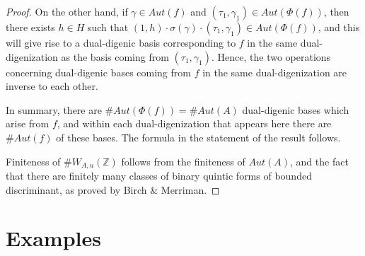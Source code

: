 \documentclass{report}
\begin{document}
\begin{proof}
On the other hand, if $\gamma \in Aut(f)$ and $(\tau_1,\gamma_1) \in Aut(\Phi(f))$, then there exists $h \in H$ such that $(1,h) \cdot \sigma(\gamma) \cdot (\tau_1,\gamma_1) \in Aut(\Phi(f))$, and this will give rise to a dual-digenic basis corresponding to $f$ in the same dual-digenization as the basis coming from $(\tau_1,\gamma_1)$.  Hence, the two operations concerning dual-digenic bases coming from $f$ in the same dual-digenization are inverse to each other.

In summary, there are $\#Aut(\Phi(f)) = \#Aut(A)$ dual-digenic bases which arise from $f$, and within each dual-digenization that appears here there are $\#Aut(f)$ of these bases.  The formula in the statement of the result follows.

Finiteness of $\# W_{A,u}(\mathbb{Z})$ follows from the finiteness of $Aut(A)$, and the fact that there are finitely many classes of binary quintic forms of bounded discriminant, as proved by Birch \& Merriman.
\end{proof}

\section{Examples}
\end{document}
